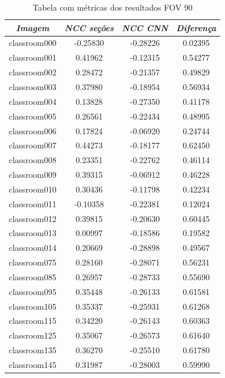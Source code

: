 \documentclass[cic,tc]{iiufrgs}
\begin{document}
\begin{table}[h]
    \caption{Tabela com métricas dos resultados FOV 90\degree}
    \vspace{0.5em}
    \centering
        \begin{tabular}{|c|c|c|c|}
          \hline
          \textit{Imagem} & \textit{NCC seções} & \textit{NCC CNN} & \textit{Diferença} \\
          \hline
          \hline
          classroom000 & -0.25830 & -0.28226 & 0.02395 \\
          classroom001 & 0.41962 & -0.12315 & 0.54277 \\
          classroom002 & 0.28472 & -0.21357 & 0.49829 \\
          classroom003 & 0.37980 & -0.18954 & 0.56934 \\
          classroom004 & 0.13828 & -0.27350 & 0.41178 \\
          classroom005 & 0.26561 & -0.22434 & 0.48995 \\
          classroom006 & 0.17824 & -0.06920 & 0.24744 \\
          classroom007 & 0.44273 & -0.18177 & 0.62450 \\
          classroom008 & 0.23351 & -0.22762 & 0.46114 \\
          classroom009 & 0.39315 & -0.06912 & 0.46228 \\
          classroom010 & 0.30436 & -0.11798 & 0.42234 \\
          classroom011 & -0.10358 & -0.22381 & 0.12024 \\
          classroom012 & 0.39815 & -0.20630 & 0.60445 \\
          classroom013 & 0.00997 & -0.18586 & 0.19582 \\
          classroom014 & 0.20669 & -0.28898 & 0.49567 \\
          classroom075 & 0.28160 & -0.28071 & 0.56231 \\
          classroom085 & 0.26957 & -0.28733 & 0.55690 \\
          classroom095 & 0.35448 & -0.26133 & 0.61581 \\
          classroom105 & 0.35337 & -0.25931 & 0.61268 \\
          classroom115 & 0.34220 & -0.26143 & 0.60363 \\
          classroom125 & 0.35067 & -0.26573 & 0.61640 \\
          classroom135 & 0.36270 & -0.25510 & 0.61780 \\
          classroom145 & 0.31987 & -0.28003 & 0.59990 \\

\end{tabular}
\end{table}
\end{document}
